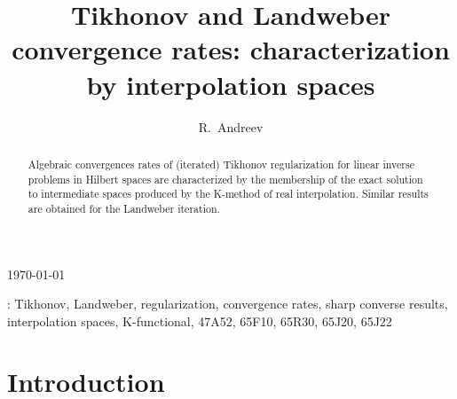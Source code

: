 \documentclass[10pt, a4paper]{iopart}
\theoremstyle{remark}
\theoremstyle{definition}
\begin{document}

\title%
[\hfill Tikhonov and Landweber rates by interpolation spaces \hfill]%
{Tikhonov and Landweber convergence rates: characterization by interpolation spaces}

\author{R.~Andreev}

\address{%
	Univ Paris Diderot, Sorbonne Paris Cit\'e, LJLL (UMR 7598 CNRS), F-75205 Paris, France
}
\vspace{10pt}
\begin{indented}
\item[]\today
\end{indented}


\begin{abstract}
	Algebraic convergences rates 
	of (iterated) Tikhonov regularization
	for linear inverse problems in Hilbert spaces
	are 
	characterized by 
	the membership of 
	the exact solution 
	to
	intermediate spaces
	produced by the K-method of real interpolation.
	Similar results are obtained for the Landweber iteration.
\end{abstract}


\vspace{2pc}
: 
Tikhonov, Landweber, regularization, convergence rates, sharp converse results,
interpolation spaces, K-functional,
47A52, %
65F10, %
65R30, %
65J20, %
65J22  %



\section{Introduction}
\label{s:0}
\end{document}
